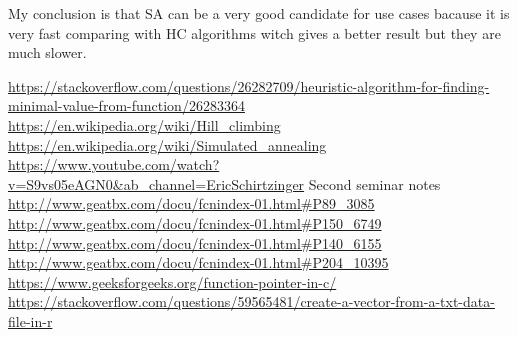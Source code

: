 \documentclass[12pt]{article}
\begin{document}
  
   My conclusion is that SA can be a very good candidate for use cases bacause it is very fast comparing with
HC algorithms witch gives a better result but they are much slower. 


\begin{thebibliography}{9}
  \bibitem{}
    \url{https://stackoverflow.com/questions/26282709/heuristic-algorithm-for-finding-minimal-value-from-function/26283364}
  \bibitem{}
    \url{https://en.wikipedia.org/wiki/Hill_climbing}
  \bibitem{}
    \url{https://en.wikipedia.org/wiki/Simulated_annealing}
  \bibitem{}
    \url{https://www.youtube.com/watch?v=S9vs05eAGN0&ab_channel=EricSchirtzinger}
  \bibitem{}
    Second seminar notes
  \bibitem{}
    \url{http://www.geatbx.com/docu/fcnindex-01.html#P89_3085}
  \bibitem{}
    \url{http://www.geatbx.com/docu/fcnindex-01.html#P150_6749}
  \bibitem{}
    \url{http://www.geatbx.com/docu/fcnindex-01.html#P140_6155}
  \bibitem{}
    \url{http://www.geatbx.com/docu/fcnindex-01.html#P204_10395}
  \bibitem{}
    \url{https://www.geeksforgeeks.org/function-pointer-in-c/}
  \bibitem{}
    \url{https://stackoverflow.com/questions/59565481/create-a-vector-from-a-txt-data-file-in-r}
  \end{thebibliography}  
  
\end{document}
